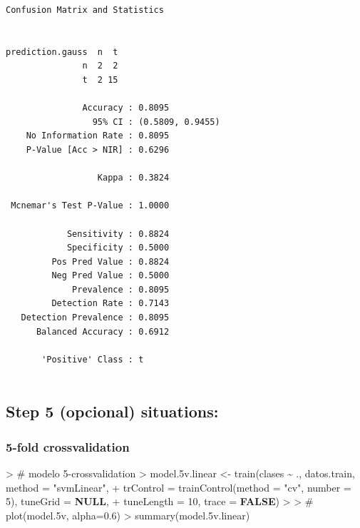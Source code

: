 \documentclass[
]{article}
\newenvironment{Shaded}{\begin{snugshade}}{\end{snugshade}}
\newcommand{\AttributeTok}[1]{\textcolor[rgb]{0.80,0.80,0.80}{#1}}
\newcommand{\CommentTok}[1]{\textcolor[rgb]{0.50,0.62,0.50}{#1}}
\newcommand{\ConstantTok}[1]{\textcolor[rgb]{0.86,0.64,0.64}{\textbf{#1}}}
\newcommand{\DecValTok}[1]{\textcolor[rgb]{0.86,0.86,0.80}{#1}}
\newcommand{\ErrorTok}[1]{\textcolor[rgb]{0.76,0.75,0.62}{#1}}
\newcommand{\FloatTok}[1]{\textcolor[rgb]{0.75,0.75,0.82}{#1}}
\newcommand{\FunctionTok}[1]{\textcolor[rgb]{0.94,0.94,0.56}{#1}}
\newcommand{\NormalTok}[1]{\textcolor[rgb]{0.80,0.80,0.80}{#1}}
\newcommand{\OtherTok}[1]{\textcolor[rgb]{0.94,0.94,0.56}{#1}}
\newcommand{\SpecialCharTok}[1]{\textcolor[rgb]{0.86,0.64,0.64}{#1}}
\newcommand{\StringTok}[1]{\textcolor[rgb]{0.80,0.58,0.58}{#1}}
\begin{document}
\begin{verbatim}
Confusion Matrix and Statistics

                
prediction.gauss  n  t
               n  2  2
               t  2 15
                                          
               Accuracy : 0.8095          
                 95% CI : (0.5809, 0.9455)
    No Information Rate : 0.8095          
    P-Value [Acc > NIR] : 0.6296          
                                          
                  Kappa : 0.3824          
                                          
 Mcnemar's Test P-Value : 1.0000          
                                          
            Sensitivity : 0.8824          
            Specificity : 0.5000          
         Pos Pred Value : 0.8824          
         Neg Pred Value : 0.5000          
             Prevalence : 0.8095          
         Detection Rate : 0.7143          
   Detection Prevalence : 0.8095          
      Balanced Accuracy : 0.6912          
                                          
       'Positive' Class : t               
                                          
\end{verbatim}

\hypertarget{step-5-opcional-situations}{%
\subsection{Step 5 (opcional)
situations:}\label{step-5-opcional-situations}}

\hypertarget{fold-crossvalidation}{%
\subsubsection{5-fold crossvalidation}\label{fold-crossvalidation}}

\begin{Shaded}
\begin{Highlighting}[]
\SpecialCharTok{\textgreater{}} \CommentTok{\# modelo 5{-}crossvalidation}
\ErrorTok{\textgreater{}}\NormalTok{ model}\FloatTok{.5}\NormalTok{v.linear }\OtherTok{\textless{}{-}} \FunctionTok{train}\NormalTok{(clases }\SpecialCharTok{\textasciitilde{}}\NormalTok{ ., datos.train, }\AttributeTok{method =} \StringTok{"svmLinear"}\NormalTok{,}
\SpecialCharTok{+}     \AttributeTok{trControl =} \FunctionTok{trainControl}\NormalTok{(}\AttributeTok{method =} \StringTok{"cv"}\NormalTok{, }\AttributeTok{number =} \DecValTok{5}\NormalTok{), }\AttributeTok{tuneGrid =} \ConstantTok{NULL}\NormalTok{,}
\SpecialCharTok{+}     \AttributeTok{tuneLength =} \DecValTok{10}\NormalTok{, }\AttributeTok{trace =} \ConstantTok{FALSE}\NormalTok{)}
\SpecialCharTok{\textgreater{}} 
\ErrorTok{\textgreater{}} \CommentTok{\# plot(model.5v, alpha=0.6)}
\ErrorTok{\textgreater{}} \FunctionTok{summary}\NormalTok{(model}\FloatTok{.5}\NormalTok{v.linear)}
\end{Highlighting}
\end{Shaded}
\end{document}
